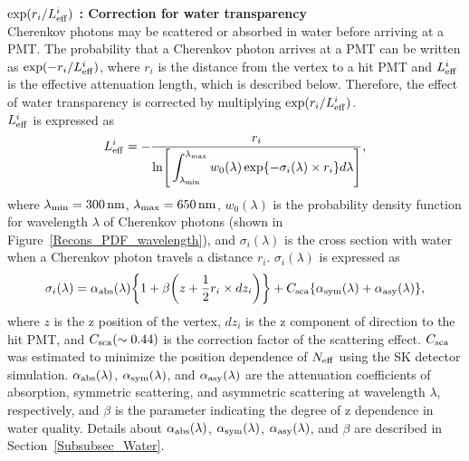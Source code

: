 \textbf{$\exp(r_{i}/L_{\rm eff}^{i})$ : Correction for water transparency}\\
\hs
Cherenkov photons may be scattered or absorbed in water before arriving at a PMT.
The probability that a Cherenkov photon arrives at a PMT can be written as $\exp(-r_{i}/L_{\rm eff}^{i})$, where $r_{i}$ is the distance from the vertex to a hit PMT and $L_{\rm eff}^{i}$ is the effective attenuation length, which is described below.
Therefore, the effect of water transparency is corrected by multiplying $\exp(r_{i}/L_{\rm eff}^{i})$.\\
\hs
$L_{\rm eff}^{i}$ is expressed as
\begin{eqnarray}
	L_{\rm eff}^{i} = -{r_{i} \over {\rm ln}\Bigg[\displaystyle \int_{\lambda_{\rm min}}^{\lambda_{\rm max}} w_{0}(\lambda)\exp\{-\sigma_{i}(\lambda) \times r_{i}\} d\lambda\Bigg]},
\end{eqnarray}
where $\lambda_{\rm min} = 300\,{\rm nm}$, $\lambda_{\rm max} = 650\,{\rm nm}$, $w_{0}(\lambda)$ is the probability density function for wavelength $\lambda$ of Cherenkov photons (shown in Figure~\ref{Recons_PDF_wavelength}), and $\sigma_{i}(\lambda)$ is the cross section with water when a Cherenkov photon travels a distance $r_{i}$.
$\sigma_{i}(\lambda)$ is expressed as
\begin{eqnarray}
	\sigma_{i}(\lambda) = \alpha_{\rm abs}(\lambda)\bigg\{1 + \beta\bigg(z + {1 \over 2}r_{i} \times dz_{i}\bigg)\bigg\} + C_{\rm sca}\{\alpha_{\rm sym}(\lambda) + \alpha_{\rm asy}(\lambda)\},
\end{eqnarray}
where $z$ is the z position of the vertex, $dz_{i}$ is the z component of direction to the hit PMT, and $C_{\rm sca} (\sim 0.44)$ is the correction factor of the scattering effect.
$C_{\rm sca}$ was estimated to minimize the position dependence of $N_{\rm eff}$ using the SK detector simulation.
$\alpha_{\rm abs}(\lambda)$, $\alpha_{\rm sym}(\lambda)$, and $\alpha_{\rm asy}(\lambda)$ are the attenuation coefficients of absorption, symmetric scattering, and asymmetric scattering at wavelength $\lambda$, respectively, and $\beta$ is the parameter indicating the degree of z dependence in water quality.
Details about $\alpha_{\rm abs}(\lambda)$, $\alpha_{\rm sym}(\lambda)$, $\alpha_{\rm asy}(\lambda)$, and $\beta$ are described in Section~\ref{Subsubsec_Water}.

